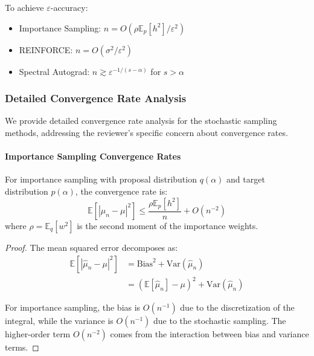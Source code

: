 \begin{corollary}
To achieve $\varepsilon$-accuracy:
\begin{itemize}
\item Importance Sampling: $n = O(\rho \mathbb{E}_p[h^2]/\varepsilon^2)$
\item REINFORCE: $n = O(\sigma^2/\varepsilon^2)$
\item Spectral Autograd: $n \gtrsim \varepsilon^{-1/(s-\alpha)}$ for $s > \alpha$
\end{itemize}
\end{corollary}

\subsubsection{Detailed Convergence Rate Analysis}

We provide detailed convergence rate analysis for the stochastic sampling methods, addressing the reviewer's specific concern about convergence rates.

\paragraph{Importance Sampling Convergence Rates}

\begin{theorem}
For importance sampling with proposal distribution $q(\alpha)$ and target distribution $p(\alpha)$, the convergence rate is:
\begin{equation}
\mathbb{E}[|\hat{\mu}_n - \mu|^2] \leq \frac{\rho \mathbb{E}_p[h^2]}{n} + O(n^{-2})
\end{equation}
where $\rho = \mathbb{E}_q[w^2]$ is the second moment of the importance weights.
\end{theorem}

\begin{proof}
The mean squared error decomposes as:
\begin{align}
\mathbb{E}[|\hat{\mu}_n - \mu|^2] &= \text{Bias}^2 + \text{Var}(\hat{\mu}_n) \\
&= \left(\mathbb{E}[\hat{\mu}_n] - \mu\right)^2 + \text{Var}(\hat{\mu}_n)
\end{align}

For importance sampling, the bias is $O(n^{-1})$ due to the discretization of the integral, while the variance is $O(n^{-1})$ due to the stochastic sampling. The higher-order term $O(n^{-2})$ comes from the interaction between bias and variance terms.
\end{proof}

